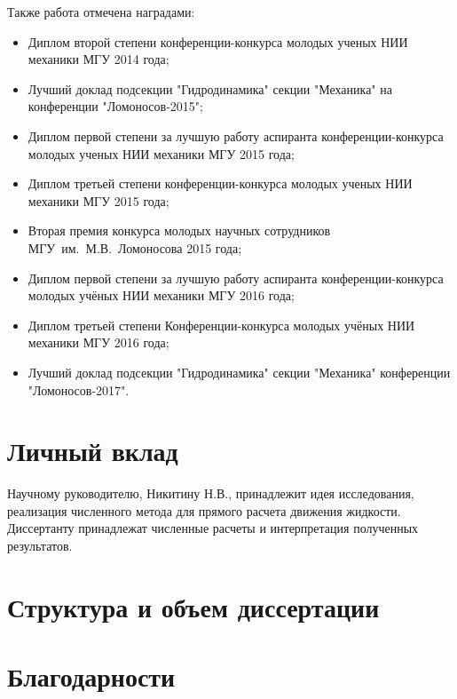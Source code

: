 Также работа отмечена наградами:
\begin{itemize}
\item Диплом второй степени конференции-конкурса молодых ученых НИИ механики МГУ 2014 года;
\item Лучший доклад подсекции "Гидродинамика" секции "Механика" на конференции "Ломоносов-2015";
\item Диплом первой степени за лучшую работу аспиранта конференции-конкурса молодых ученых НИИ механики МГУ 2015 года;
\item Диплом третьей степени конференции-конкурса молодых ученых НИИ механики МГУ 2015 года;
\item Вторая премия конкурса молодых научных сотрудников МГУ~им.~М.В.~Ломоносова 2015 года;
\item Диплом первой степени за лучшую работу аспиранта конференции-конкурса молодых учёных НИИ механики МГУ 2016 года;
\item Диплом третьей степени Конференции-конкурса молодых учёных НИИ механики МГУ 2016 года;
\item Лучший доклад подсекции "Гидродинамика" секции "Механика" конференции "Ломоносов-2017".
\end{itemize}


\section{Личный вклад}

Научному руководителю, Никитину Н.В., принадлежит идея исследования, реализация численного метода для прямого расчета движения жидкости. Диссертанту принадлежат численные расчеты и интерпретация полученных результатов. 


\section{Структура и объем диссертации}

\section{Благодарности}


